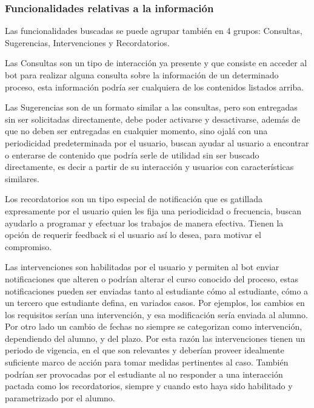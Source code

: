         \subsubsection{Funcionalidades relativas a la información}
            \par Las funcionalidades buscadas se puede agrupar también en 4 grupos: Consultas, Sugerencias, Intervenciones y Recordatorios.
            \par Las Consultas son un tipo de interacción ya presente y que consiste en acceder al bot para realizar alguna consulta sobre la información de un determinado proceso, esta información podría ser cualquiera de los contenidos listados arriba.
            \par Las Sugerencias son de un formato similar a las consultas, pero son entregadas sin ser solicitadas directamente, debe poder activarse y desactivarse, además de que no deben ser entregadas en cualquier momento, sino ojalá con una periodicidad predeterminada por el usuario, buscan ayudar al usuario a encontrar o enterarse de contenido que podría serle de utilidad sin ser buscado directamente, es decir a partir de su interacción y usuarios con características similares.
            \par Los recordatorios son un tipo especial de notificación que es gatillada expresamente por el usuario quien les fija una periodicidad o frecuencia, buscan ayudarlo a programar y efectuar los trabajos de manera efectiva. Tienen la opción de requerir feedback si el usuario así lo desea, para motivar el compromiso.
            \par Las intervenciones son habilitadas por el usuario y permiten al bot enviar notificaciones que alteren o podrían alterar el curso conocido del proceso, estas notificaciones pueden ser enviadas tanto al estudiante cómo al estudiante, cómo a un tercero que estudiante defina, en variados casos. Por ejemplos, los cambios en los requisitos serían una intervención, y esa modificación sería enviada al alumno. Por otro lado un cambio de fechas no siempre se categorizan como intervención, dependiendo del alumno, y del plazo. Por esta razón las intervenciones tienen un periodo de vigencia, en el que son relevantes y deberían proveer idealmente suficiente marco de acción para tomar medidas pertinentes al caso. También podrían ser provocadas por el estudiante al no responder a una interacción pactada como los recordatorios, siempre y cuando esto haya sido habilitado y parametrizado por el alumno.
        

